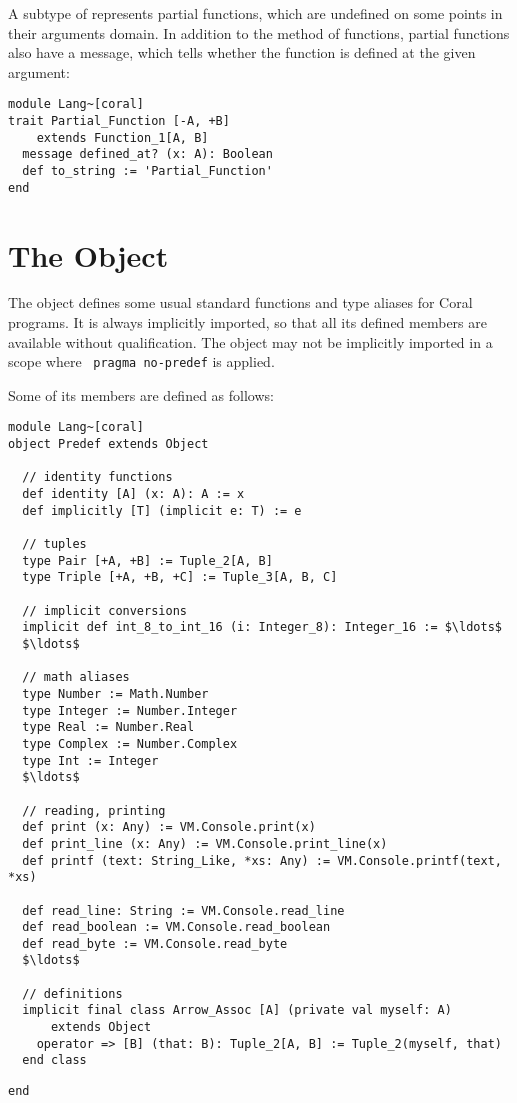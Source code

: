 A subtype of  represents partial functions, which are undefined on some points in their arguments domain. In addition to the  method of functions, partial functions also have a  message, which tells whether the function is defined at the given argument:

\begin{lstlisting}
module Lang~[coral]
trait Partial_Function [-A, +B]
    extends Function_1[A, B]
  message defined_at? (x: A): Boolean
  def to_string := 'Partial_Function'
end
\end{lstlisting}





\section{The  Object}
\label{sec:predef}

The  object defines some usual standard functions and type aliases for Coral programs. It is always implicitly imported, so that all its defined members are available without qualification. The  object may not be implicitly imported in a scope where ~\lstinline!pragma no-predef! is applied. 

Some of its members are defined as follows:
\begin{lstlisting}
module Lang~[coral]
object Predef extends Object

  // identity functions
  def identity [A] (x: A): A := x
  def implicitly [T] (implicit e: T) := e

  // tuples
  type Pair [+A, +B] := Tuple_2[A, B]
  type Triple [+A, +B, +C] := Tuple_3[A, B, C]

  // implicit conversions
  implicit def int_8_to_int_16 (i: Integer_8): Integer_16 := $\ldots$
  $\ldots$

  // math aliases
  type Number := Math.Number
  type Integer := Number.Integer
  type Real := Number.Real
  type Complex := Number.Complex
  type Int := Integer
  $\ldots$
  
  // reading, printing
  def print (x: Any) := VM.Console.print(x)
  def print_line (x: Any) := VM.Console.print_line(x)
  def printf (text: String_Like, *xs: Any) := VM.Console.printf(text, *xs)
  
  def read_line: String := VM.Console.read_line
  def read_boolean := VM.Console.read_boolean
  def read_byte := VM.Console.read_byte
  $\ldots$
  
  // definitions
  implicit final class Arrow_Assoc [A] (private val myself: A)
      extends Object
    operator => [B] (that: B): Tuple_2[A, B] := Tuple_2(myself, that)
  end class
\end{lstlisting}\begin{lstlisting}
end
\end{lstlisting}






